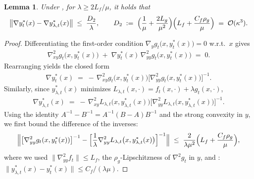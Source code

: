 \documentclass{uai2026} %
\newtheorem{lemma}{Lemma}[section]
\begin{document}
\begin{lemma}
\label{lem:B5}
Under , for $\lambda \ge 2L_f/\mu$, it holds that
\[
\bigl\|\nabla y^*_{t}(x) - \nabla y^*_{\lambda,t}(x)\bigr\| \;\le\; \frac{D_2}{\lambda},
\qquad
D_2 \;:=\; \Bigl(\frac{1}{\mu} + \frac{2L_g}{\mu^2}\Bigr)\Bigl(L_f + \frac{C_f\rho_g}{\mu}\Bigr)
\;=\; \mathcal{O}(\kappa^3).
\]
\end{lemma}
\begin{proof}
Differentiating the first-order condition $\nabla_y g_{t}\bigl(x,y^*_{t}(x)\bigr)=0$ w.r.t.\ $x$ gives
\begin{align}\label{eq_004}
\nabla^2_{xy} g_{t}\bigl(x,y^*_{t}(x)\bigr) \;+\; \nabla y^*_{t}(x)\,\nabla^2_{yy} g_{t}\bigl(x,y^*_{t}(x)\bigr) \;=\; 0.
\end{align}
Rearranging yields the closed form
\begin{align}\label{eq_005}
\nabla y^*_{t}(x) \;=\; -\,\nabla^2_{xy} g_{t}\bigl(x,y^*_{t}(x)\bigr)\bigl[\nabla^2_{yy} g_{t}\bigl(x,y^*_{t}(x)\bigr)\bigr]^{-1}. 
\end{align}
Similarly, since $y^*_{\lambda,t}(x)$ minimizes $L_{\lambda,t}(x,\cdot)=f_{t}(x,\cdot)+\lambda g_{t}(x,\cdot)$,
\begin{align}\label{eq_006}
\nabla y^*_{\lambda,t}(x) \;=\; -\,\nabla^2_{xy} L_{\lambda,t}\bigl(x,y^*_{\lambda,t}(x)\bigr)
\bigl[\nabla^2_{yy} L_{\lambda,t}\bigl(x,y^*_{\lambda,t}(x)\bigr)\bigr]^{-1}.
\end{align}
Using the identity $A^{-1}-B^{-1}=A^{-1}(B-A)B^{-1}$ and the strong convexity in $y$,
we first bound the difference of the inverses:
\[
\Bigl\|
\bigl[\nabla^2_{yy}g_{t}(x,y^*_{t}(x))\bigr]^{-1}
-\Bigl[\frac{1}{\lambda}\nabla^2_{yy}L_{\lambda,t}\bigl(x,y^*_{\lambda,t}(x)\bigr)\Bigr]^{-1}
\Bigr\|
\;\le\; \frac{2}{\lambda \mu^2}\Bigl(L_f + \frac{C_f\rho_g}{\mu}\Bigr),
\]
where we used $\|\nabla^2_{yy}f_{t}\| \le L_f$, the $\rho_g$-Lipschitzness of $\nabla^2 g_{t}$ in $y$,
and : $\|y^*_{\lambda,t}(x)-y^*_{t}(x)\| \le C_f/(\lambda\mu)$. 


\end{proof}
\end{document}
